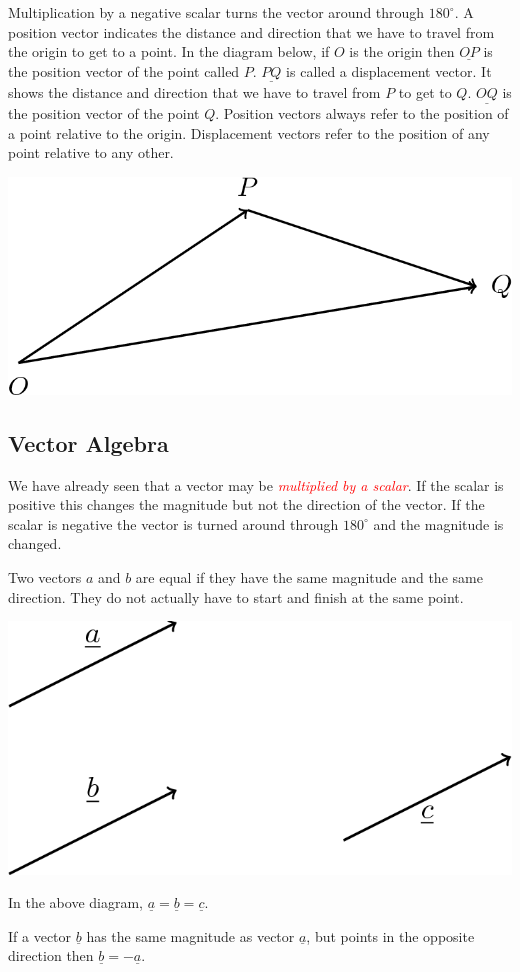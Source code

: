 \documentclass[
  11pt,
  oneside]{book}
\newcommand{\slide}{}
\theoremstyle{definition}
\theoremstyle{definition}
\theoremstyle{definition}
\theoremstyle{definition}
\theoremstyle{remark}
\begin{document}
Multiplication by a negative scalar turns the vector around through \(180^\circ\). A position vector indicates the distance and direction that we have to travel from the origin to get to a point. In the diagram below, if \(O\) is the origin then \(\underline{OP}\) is the position vector of the point called \(P\). \(\underline{PQ}\) is called a displacement vector. It shows the distance and direction that we have to travel from \(P\) to get to \(Q\). \(\underline{OQ}\) is the position vector of the point \(Q\). Position vectors always refer to the position of a point relative to the origin. Displacement vectors refer to the position of any point relative to any other.

\begin{center}\includegraphics[width=0.3\linewidth]{tikztopng-figure48} \end{center}

\slide

\subsection{Vector Algebra}\label{vector-algebra}

We have already seen that a vector may be \textcolor{red}{\em multiplied by a scalar}. If the scalar is positive this changes the magnitude but not the direction of the vector. If the scalar is negative the vector is turned around through \(180^\circ\) and the magnitude is changed.

Two vectors \(a\) and \(b\) are equal if they have the same magnitude and the same direction. They do not actually have to start and finish at the same point.

\begin{center}\includegraphics[width=0.3\linewidth]{tikztopng-figure49} \end{center}

In the above diagram, \(\underline a= \underline b = \underline c\).

If a vector \(\underline b\) has the same magnitude as vector \(\underline a\), but points in the opposite direction then \(\underline b = -\underline a\).
\end{document}
